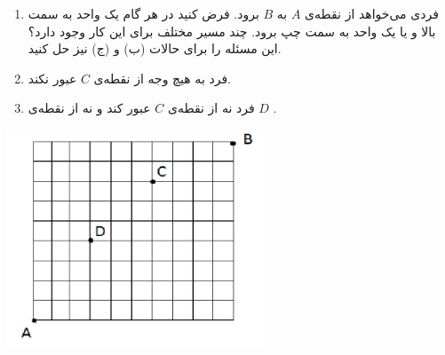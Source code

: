 \EXERCISE
\begin{enumerate}
\item
فردی می‌خواهد از نقطه‌ی
$A$
به
$B$
برود. فرض کنید در هر گام یک واحد به سمت بالا و یا یک واحد به سمت چپ برود. چند مسیر مختلف برای این کار وجود دارد؟ این مسئله را برای حالات (ب) و (ج) نیز حل کنید.
\item
فرد به هیچ وجه از نقطه‌ی
$C$
عبور نکند.
\item
فرد نه از نقطه‌ی
$C$
عبور کند و نه از نقطه‌ی
$D$
.
\end{enumerate}
\begin{center}
\includegraphics[height=6.5cm]{26.png}
\end{center}